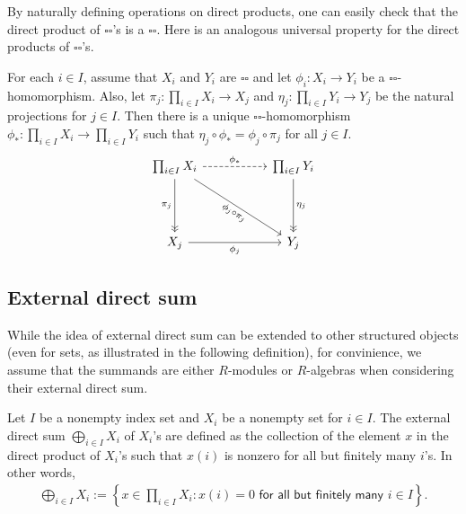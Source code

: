 By naturally defining operations on direct products, one can easily check that the direct product of $\square\square$'s is a $\square\square$.
Here is an analogous universal property for the direct products of $\square\square$'s.
\begin{prop}
    For each $i\in I$, assume that $X_i$ and $Y_i$ are $\square\square$ and let $\phi_i: X_i\rightarrow Y_i$ be a $\square\square$-homomorphism.
    Also, let $\pi_j: \prod_{i\in I} X_i \rightarrow X_j$ and $\eta_j: \prod_{i\in I} Y_i \rightarrow Y_j$ be the natural projections for $j\in I$.
    Then there is a unique $\square\square$-homomorphism $\phi_*: \prod_{i\in I} X_i\rightarrow \prod_{i\in I} Y_i$ such that $\eta_j\circ\phi_*=\phi_j\circ\pi_j$ for all $j\in I$.
    \begin{equation*}
    \begin{tikzcd}[row sep=1.5cm, column sep=1.8cm]
        \prod_{i\in I} X_i
        \arrow[r, "\phi_*", dashed]
        \arrow[d, "\pi_j"', ->>]
        \arrow[dr, "\phi_j\circ\pi_j"', sloped]
        &
        \prod_{i\in I} Y_i
        \arrow[d, "\eta_j", ->>]
        \\
        X_j
        \arrow[r, "\phi_j"']
        &
        Y_j
    \end{tikzcd}
    \end{equation*}
\end{prop}


\subsection{External direct sum}

While the idea of external direct sum can be extended to other structured objects (even for sets, as illustrated in the following definition), for convinience, we assume that the summands are either $R$-modules or $R$-algebras when considering their external direct sum.

\begin{defi}
    Let $I$ be a nonempty index set and $X_i$ be a nonempty set for $i\in I$.
    The external direct sum $\bigoplus_{i\in I} X_i$ of $X_i$'s are defined as the collection of the element $x$ in the direct product of $X_i$'s such that $x(i)$ is nonzero for all but finitely many $i$'s.
    In other words,
    \begin{align*}
        \bigoplus_{i\in I} X_i:=\left\{x\in\prod_{i\in I}X_i : x(i)=0\textsf{ for all but finitely many }i\in I\right\}.
    \end{align*}
\end{defi}

